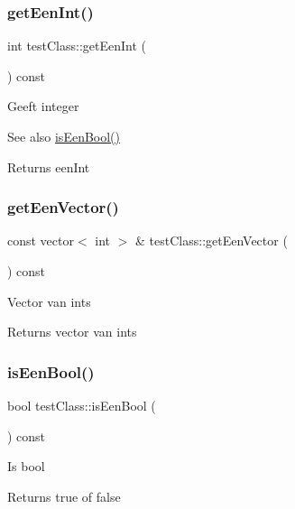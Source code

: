 \subsubsection{\texorpdfstring{get\+Een\+Int()}{getEenInt()}}
{\footnotesize\ttfamily int test\+Class\+::get\+Een\+Int (\begin{DoxyParamCaption}{ }\end{DoxyParamCaption}) const}

Geeft integer \begin{DoxySeeAlso}{See also}
\mbox{\hyperlink{classtest_class_a612e143a01b0be6d2cdfc1d9387ce419}{is\+Een\+Bool()}} 
\end{DoxySeeAlso}
\begin{DoxyReturn}{Returns}
een\+Int 
\end{DoxyReturn}
\mbox{\label{classtest_class_af95bb3c6a2ce889dd87e93810aac8682}} 
\subsubsection{\texorpdfstring{get\+Een\+Vector()}{getEenVector()}}
{\footnotesize\ttfamily const vector$<$ int $>$ \& test\+Class\+::get\+Een\+Vector (\begin{DoxyParamCaption}{ }\end{DoxyParamCaption}) const}

Vector van ints \begin{DoxyReturn}{Returns}
vector van ints 
\end{DoxyReturn}
\mbox{\label{classtest_class_a612e143a01b0be6d2cdfc1d9387ce419}} 
\subsubsection{\texorpdfstring{is\+Een\+Bool()}{isEenBool()}}
{\footnotesize\ttfamily bool test\+Class\+::is\+Een\+Bool (\begin{DoxyParamCaption}{ }\end{DoxyParamCaption}) const}

Is bool \begin{DoxyReturn}{Returns}
true of false 
\end{DoxyReturn}
\mbox{\label{classtest_class_a1cfdd64874baa4278adc3eb196f2e2f0}} 
